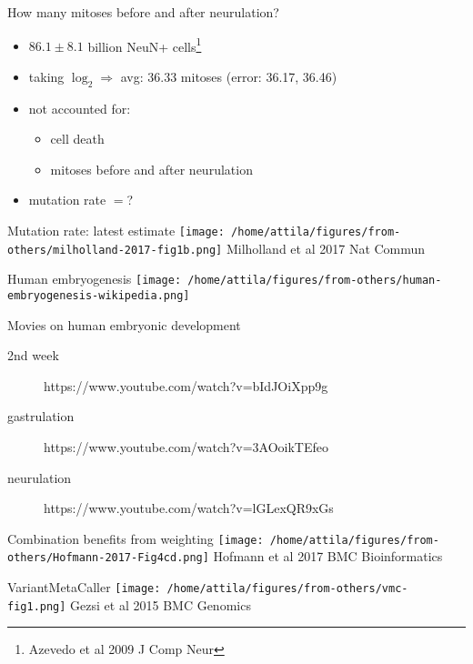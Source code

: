 \documentclass{beamer}
\begin{document}

\begin{frame}{How many mitoses before and after neurulation?}
\begin{itemize}
\item \(86.1 \pm 8.1\) billion NeuN+ cells\footnote{Azevedo et al 2009 J Comp
Neur}
\item taking \(\log_2 \Rightarrow\) avg: 36.33 mitoses (error: 36.17, 36.46)
\item not accounted for:
\begin{itemize}
\item cell death
\item mitoses before and after neurulation  
\end{itemize}
\item mutation rate \(=\)?
\end{itemize}
\end{frame}

\begin{frame}{Mutation rate: latest estimate}
\texttt{[image: /home/attila/figures/from-others/milholland-2017-fig1b.png]}
\vfill
\footnotesize{Milholland et al 2017 Nat Commun}
\end{frame}

\begin{frame}{Human embryogenesis}
\texttt{[image: /home/attila/figures/from-others/human-embryogenesis-wikipedia.png]}
\end{frame}

\begin{frame}{Movies on human embryonic development}
\begin{description}
\item[2nd week]
https://www.youtube.com/watch?v=bIdJOiXpp9g
\item[gastrulation]
https://www.youtube.com/watch?v=3AOoikTEfeo
\item[neurulation] 
https://www.youtube.com/watch?v=lGLexQR9xGs
\end{description}
\end{frame}



\begin{frame}{Combination benefits from weighting}
\texttt{[image: /home/attila/figures/from-others/Hofmann-2017-Fig4cd.png]}
\vfill
\footnotesize{Hofmann et al 2017 BMC Bioinformatics}
\end{frame}

\begin{frame}{VariantMetaCaller}
\texttt{[image: /home/attila/figures/from-others/vmc-fig1.png]}
\vfill
\footnotesize{Gezsi et al 2015 BMC Genomics}
\end{frame}
\end{document}
